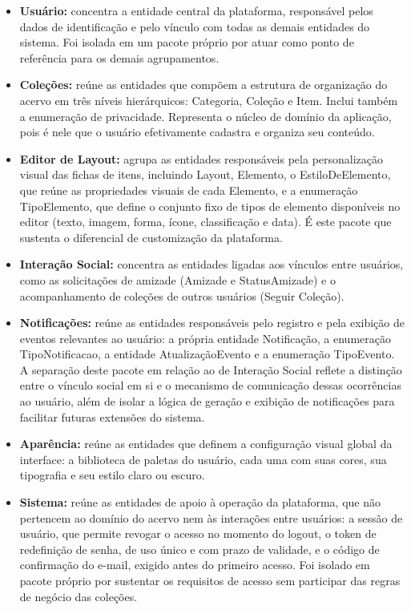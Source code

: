 \begin{itemize}[nosep,leftmargin=1.5em,topsep=4pt,partopsep=0pt,
               parsep=2pt,itemsep=4pt]

  \item \textbf{Usuário:} concentra a entidade central da plataforma,
  responsável pelos dados de identificação e pelo vínculo com todas as demais
  entidades do sistema. Foi isolada em um pacote próprio por atuar como ponto
  de referência para os demais agrupamentos.

  \item \textbf{Coleções:} reúne as entidades que compõem a estrutura de
  organização do acervo em três níveis hierárquicos: Categoria, Coleção e
  Item. Inclui também a enumeração de
  privacidade. Representa o núcleo de domínio da aplicação, pois é nele que
  o usuário efetivamente cadastra e organiza seu conteúdo.

  \item \textbf{Editor de Layout:} agrupa as entidades responsáveis pela
  personalização visual das fichas de itens, incluindo Layout, Elemento, o
  EstiloDeElemento, que reúne as propriedades visuais de cada Elemento, e a
  enumeração TipoElemento, que define o conjunto fixo de tipos de elemento
  disponíveis no editor (texto, imagem, forma, ícone, classificação e
  data). É este pacote que sustenta o diferencial de
  customização da plataforma.

  \item \textbf{Interação Social:} concentra as entidades ligadas aos
  vínculos entre usuários, como as solicitações de amizade (Amizade e
  StatusAmizade) e o acompanhamento de coleções de outros usuários
  (Seguir Coleção).

  \item \textbf{Notificações:} reúne as entidades responsáveis pelo
  registro e pela exibição de eventos relevantes ao usuário: a própria
  entidade Notificação, a enumeração TipoNotificacao, a entidade
  AtualizaçãoEvento e a enumeração TipoEvento. A separação deste pacote
  em relação ao de Interação Social reflete a distinção entre o vínculo
  social em si e o mecanismo de comunicação dessas ocorrências ao usuário,
  além de isolar a lógica de geração e exibição de notificações para
  facilitar futuras extensões do sistema.

  \item \textbf{Aparência:} reúne as entidades que definem a configuração
  visual global da interface: a biblioteca de paletas do usuário, cada uma
  com suas cores, sua tipografia e seu estilo claro ou escuro.

  \item \textbf{Sistema:} reúne as entidades de apoio à operação da
  plataforma, que não pertencem ao domínio do acervo nem às interações entre
  usuários: a sessão de usuário, que permite revogar o acesso no momento do
  logout, o token de redefinição de senha, de uso único e com prazo de
  validade, e o código de confirmação do e-mail, exigido antes do primeiro
  acesso. Foi isolado em pacote próprio por sustentar os requisitos de acesso
  sem participar das regras de negócio das coleções.

\end{itemize}

